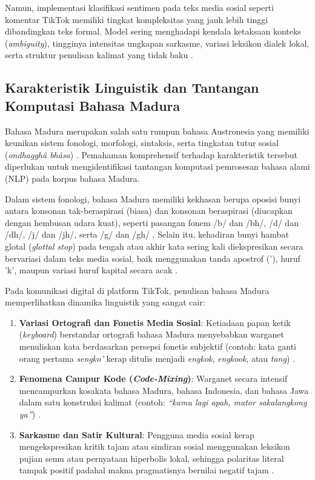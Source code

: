 Namun, implementasi klasifikasi sentimen pada teks media sosial seperti komentar TikTok memiliki tingkat kompleksitas yang jauh lebih tinggi dibandingkan teks formal. Model sering menghadapi kendala ketaksaan konteks (\textit{ambiguity}), tingginya intensitas ungkapan sarkasme, variasi leksikon dialek lokal, serta struktur penulisan kalimat yang tidak baku \citep{luther2026analisis, saputra2026reaksi}.

\subsection{Karakteristik Linguistik dan Tantangan Komputasi Bahasa Madura}

Bahasa Madura merupakan salah satu rumpun bahasa Austronesia yang memiliki keunikan sistem fonologi, morfologi, sintaksis, serta tingkatan tutur sosial (\textit{ondhagghâ bhâsa}) \citep{aji2022one, firmansyah2021klasifikasi}. Pemahaman komprehensif terhadap karakteristik tersebut diperlukan untuk mengidentifikasi tantangan komputasi pemrosesan bahasa alami (NLP) pada korpus bahasa Madura.

Dalam sistem fonologi, bahasa Madura memiliki kekhasan berupa oposisi bunyi antara konsonan tak-beraspirasi (biasa) dan konsonan beraspirasi (diucapkan dengan hembusan udara kuat), seperti pasangan fonem /b/ dan /bh/, /d/ dan /dh/, /j/ dan /jh/, serta /g/ dan /gh/ \citep{arifin2026heuristic}. Selain itu, kehadiran bunyi hambat glotal (\textit{glottal stop}) pada tengah atau akhir kata sering kali diekspresikan secara bervariasi dalam teks media sosial, baik menggunakan tanda apostrof ('), huruf 'k', maupun variasi huruf kapital secara acak \citep{firmansyah2021klasifikasi}.

Pada komunikasi digital di platform TikTok, penulisan bahasa Madura memperlihatkan dinamika linguistik yang sangat cair:
\begin{enumerate}
    \item \textbf{Variasi Ortografi dan Fonetis Media Sosial}: Ketiadaan papan ketik (\textit{keyboard}) berstandar ortografi bahasa Madura menyebabkan warganet menuliskan kata berdasarkan persepsi fonetis subjektif (contoh: kata ganti orang pertama \textit{sengko'} kerap ditulis menjadi \textit{engkok}, \textit{engkook}, atau \textit{tang}) \citep{arifin2026heuristic}.
    \item \textbf{Fenomena Campur Kode (\textit{Code-Mixing})}: Warganet secara intensif mencampurkan kosakata bahasa Madura, bahasa Indonesia, dan bahasa Jawa dalam satu konstruksi kalimat (contoh: \textit{“kamu lagi apah, mator sakalangkong ya”}) \citep{syauri2026analisis}.
    \item \textbf{Sarkasme dan Satir Kultural}: Pengguna media sosial kerap mengekspresikan kritik tajam atau sindiran sosial menggunakan leksikon pujian semu atau pernyataan hiperbolis lokal, sehingga polaritas literal tampak positif padahal makna pragmatisnya bernilai negatif tajam \citep{luther2026analisis, saputra2026reaksi}.
\end{enumerate}

